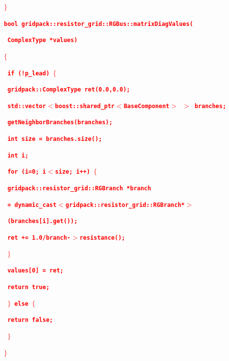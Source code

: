 \documentclass[12pt]{report} %
\begin{document}
\textcolor{red}{\texttt{\textbf{$\boldsymbol{\mathrm{\}}}$}}}

\textcolor{red}{\texttt{\textbf{bool gridpack::resistor\_grid::RGBus::matrixDiagValues(}}}

\textcolor{red}{\texttt{\textbf{   ComplexType *values)}}}

\textcolor{red}{\texttt{\textbf{$\boldsymbol{\mathrm{\{}}$}}}

\textcolor{red}{\texttt{\textbf{  if (!p\_lead) $\boldsymbol{\mathrm{\{}}$}}}

\textcolor{red}{\texttt{\textbf{    gridpack::ComplexType ret(0.0,0.0);}}}

\textcolor{red}{\texttt{\textbf{    std::vector$\boldsymbol{\mathrm{<}}$boost::shared\_ptr$\boldsymbol{\mathrm{<}}$BaseComponent$\boldsymbol{\mathrm{>}}$ $\boldsymbol{\mathrm{>}}$ branches;}}}

\textcolor{red}{\texttt{\textbf{    getNeighborBranches(branches);}}}

\textcolor{red}{\texttt{\textbf{    int size = branches.size();}}}

\textcolor{red}{\texttt{\textbf{    int i;}}}

\textcolor{red}{\texttt{\textbf{    for (i=0; i$\boldsymbol{\mathrm{<}}$size; i++) $\boldsymbol{\mathrm{\{}}$}}}

\textcolor{red}{\texttt{\textbf{      gridpack::resistor\_grid::RGBranch *branch}}}

\textcolor{red}{\texttt{\textbf{        = dynamic\_cast$\boldsymbol{\mathrm{<}}$gridpack::resistor\_grid::RGBranch*$\boldsymbol{\mathrm{>}}$}}}

\textcolor{red}{\texttt{\textbf{          (branches[i].get());}}}

\textcolor{red}{\texttt{\textbf{      ret += 1.0/branch-$\boldsymbol{\mathrm{>}}$resistance();}}}

\textcolor{red}{\texttt{\textbf{    $\boldsymbol{\mathrm{\}}}$}}}

\textcolor{red}{\texttt{\textbf{    values[0] = ret;}}}

\textcolor{red}{\texttt{\textbf{    return true;}}}

\textcolor{red}{\texttt{\textbf{  $\boldsymbol{\mathrm{\}}}$ else $\boldsymbol{\mathrm{\{}}$}}}

\textcolor{red}{\texttt{\textbf{    return false;}}}

\textcolor{red}{\texttt{\textbf{  $\boldsymbol{\mathrm{\}}}$}}}

\textcolor{red}{\texttt{\textbf{$\boldsymbol{\mathrm{\}}}$}}}
\end{document}
